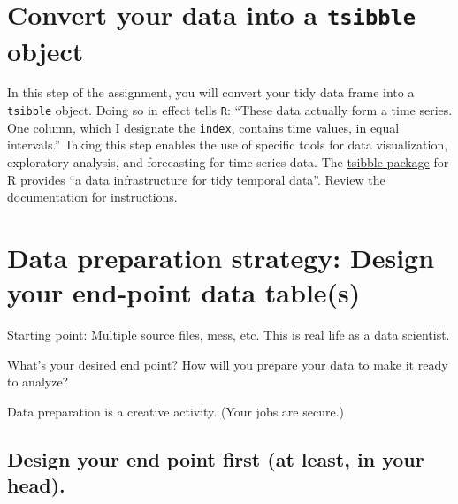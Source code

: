 \documentclass[
]{book}
\begin{document}
\hypertarget{convert-your-data-into-a-tsibble-object}{%
\section{\texorpdfstring{Convert your data into a \texttt{tsibble} object}{Convert your data into a tsibble object}}\label{convert-your-data-into-a-tsibble-object}}

In this step of the assignment, you will convert your tidy data frame into a \texttt{tsibble} object. Doing so in effect tells \texttt{R}: ``These data actually form a time series. One column, which I designate the \texttt{index}, contains time values, in equal intervals.'' Taking this step enables the use of specific tools for data visualization, exploratory analysis, and forecasting for time series data. The \href{https://tsibble.tidyverts.org/}{tsibble package} for R provides ``a data infrastructure for tidy temporal data''. Review the documentation for instructions.

\hypertarget{data-preparation-strategy-design-your-end-point-data-tables}{%
\section{Data preparation strategy: Design your end-point data table(s)}\label{data-preparation-strategy-design-your-end-point-data-tables}}

Starting point: Multiple source files, mess, etc. This is real life as a data scientist.

What's your desired end point? How will you prepare your data to make it ready to analyze?

Data preparation is a creative activity. (Your jobs are secure.)

\hypertarget{design-your-end-point-first-at-least-in-your-head.}{%
\subsection{Design your end point first (at least, in your head).}\label{design-your-end-point-first-at-least-in-your-head.}}
\end{document}
